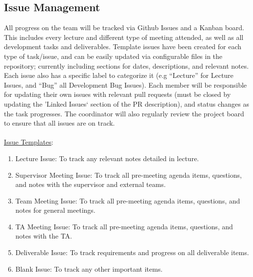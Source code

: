 \documentclass{article}
\begin{document}
\subsection*{Issue Management}
All progress on the team will be tracked via Github Issues and a Kanban board. 
This includes every lecture and different type of meeting attended, as well as all
development tasks and deliverables. Template issues have been created for
each type of task/issue, and can be easily updated via configurable files in the repository;
currently including sections for dates, descriptions, and relevant notes. Each issue also
has a specific label to categorize it (e.g ``Lecture'' for Lecture Issues, and ``Bug''
all Development Bug Issues).
Each member will be responsible for updating their own issues with relevant pull requests (must be closed by updating the 'Linked Issues` section of the PR description),
and status changes as the task progresses. The coordinator will also regularly 
review the project board to ensure that all issues are on track.
\\\\
\underline{Issue Templates}:
\begin{enumerate}
    \item Lecture Issue: To track any relevant notes detailed in lecture.
    \item Supervisor Meeting Issue: To track all pre-meeting agenda items, questions, and notes with the supervisor and external teams.
    \item Team Meeting Issue: To track all pre-meeting agenda items, questions, and notes for general meetings.
    \item TA Meeting Issue: To track all pre-meeting agenda items, questions, and notes with the TA.
    \item Deliverable Issue: To track requirements and progress on all deliverable items.
    \item Blank Issue: To track any other important items.
\end{enumerate}
\end{document}
